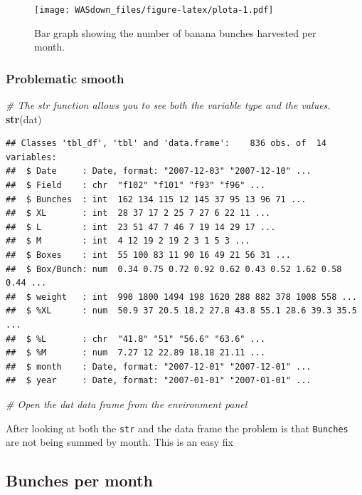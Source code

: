 \documentclass[]{book}
\newenvironment{Shaded}{\begin{snugshade}}{\end{snugshade}}
\newcommand{\KeywordTok}[1]{\textcolor[rgb]{0.13,0.29,0.53}{\textbf{{#1}}}}
\newcommand{\CommentTok}[1]{\textcolor[rgb]{0.56,0.35,0.01}{\textit{{#1}}}}
\newcommand{\NormalTok}[1]{{#1}}
\theoremstyle{definition}
\theoremstyle{definition}
\theoremstyle{remark}
\begin{document}
\begin{figure}[htbp]
\centering
\texttt{[image: WASdown\_files/figure-latex/plota-1.pdf]}
\caption{\label{fig:plota}Bar graph showing the number of banana bunches
harvested per month.}
\end{figure}

\subsubsection{Problematic smooth}\label{problematic-smooth}

\begin{Shaded}
\begin{Highlighting}[]
\CommentTok{# The str function allows you to see both the variable type and the values.}
\KeywordTok{str}\NormalTok{(dat)}
\end{Highlighting}
\end{Shaded}

\begin{verbatim}
## Classes 'tbl_df', 'tbl' and 'data.frame':    836 obs. of  14 variables:
##  $ Date     : Date, format: "2007-12-03" "2007-12-10" ...
##  $ Field    : chr  "f102" "f101" "f93" "f96" ...
##  $ Bunches  : int  162 134 115 12 145 37 95 13 96 71 ...
##  $ XL       : int  28 37 17 2 25 7 27 6 22 11 ...
##  $ L        : int  23 51 47 7 46 7 19 14 29 17 ...
##  $ M        : int  4 12 19 2 19 2 3 1 5 3 ...
##  $ Boxes    : int  55 100 83 11 90 16 49 21 56 31 ...
##  $ Box/Bunch: num  0.34 0.75 0.72 0.92 0.62 0.43 0.52 1.62 0.58 0.44 ...
##  $ weight   : int  990 1800 1494 198 1620 288 882 378 1008 558 ...
##  $ %XL      : num  50.9 37 20.5 18.2 27.8 43.8 55.1 28.6 39.3 35.5 ...
##  $ %L       : chr  "41.8" "51" "56.6" "63.6" ...
##  $ %M       : num  7.27 12 22.89 18.18 21.11 ...
##  $ month    : Date, format: "2007-12-01" "2007-12-01" ...
##  $ year     : Date, format: "2007-01-01" "2007-01-01" ...
\end{verbatim}

\begin{Shaded}
\begin{Highlighting}[]
\CommentTok{# Open the dat data frame from the environment panel}
\end{Highlighting}
\end{Shaded}

After looking at both the \texttt{str} and the data frame the problem is
that \texttt{Bunches} are not being summed by month. This is an easy fix

\subsection{Bunches per month}\label{bunches-per-month-1}
\end{document}
